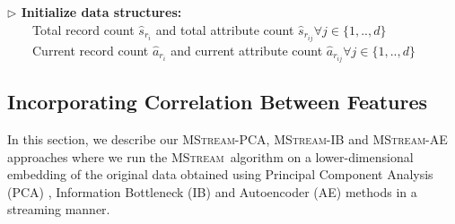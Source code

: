 \documentclass[sigconf]{acmart}
\newcommand{\method}{\textsc{MStream}}
\begin{document}
\begin{algorithm}
	\caption{\method:\ Streaming Anomaly Scoring \label{alg:mstream}}
	{\bf $\triangleright$ Initialize data structures:} \\
	\ \ \ \ Total record count $\hat{s}_{r_{i}}$ and total attribute count $\hat{s}_{r_{ij}} \forall j \in \{1,..,d\}$ \\
	\ \ \ \ Current record count $\hat{a}_{r_{i}}$ and current attribute count  $\hat{a}_{r_{ij}} \forall j \in \{1,..,d\}$ \\
\end{algorithm}


\subsection{Incorporating Correlation Between Features}
\label{sec:mstreamae}

In this section, we describe our \method-PCA, \method-IB and \method-AE approaches where we run the \method\ algorithm on a lower-dimensional embedding of the original data obtained using Principal Component Analysis (PCA) \cite{pearson1901liii}, Information Bottleneck (IB) \cite{tishby2000information} and Autoencoder (AE) \cite{hinton1994autoencoders} methods in a streaming manner.
\end{document}
